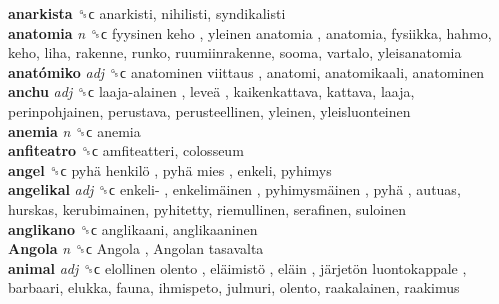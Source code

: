 \textbf{anarkista} ␝ϲ  anarkisti, nihilisti, syndikalisti  \\
\textbf{anatomia} \emph{n}  ␝ϲ   fyysinen keho ,  yleinen anatomia , anatomia, fysiikka, hahmo, keho, liha, rakenne, runko, ruumiinrakenne, sooma, vartalo, yleisanatomia  \\
\textbf{anatómiko} \emph{adj}  ␝ϲ   anatominen viittaus , anatomi, anatomikaali, anatominen  \\
\textbf{anchu} \emph{adj}  ␝ϲ   laaja-alainen ,  leveä , kaikenkattava, kattava, laaja, perinpohjainen, perustava, perusteellinen, yleinen, yleisluonteinen  \\
\textbf{anemia} \emph{n}  ␝ϲ  anemia  \\
\textbf{anfiteatro} ␝ϲ  amfiteatteri, colosseum  \\
\textbf{angel} ␝ϲ   pyhä henkilö ,  pyhä mies , enkeli, pyhimys  \\
\textbf{angelikal} \emph{adj}  ␝ϲ   enkeli- ,  enkelimäinen ,  pyhimysmäinen ,  pyhä , autuas, hurskas, kerubimainen, pyhitetty, riemullinen, serafinen, suloinen  \\
\textbf{anglikano} ␝ϲ  anglikaani, anglikaaninen  \\
\textbf{Angola} \emph{n}  ␝ϲ   Angola ,  Angolan tasavalta   \\
\textbf{animal} \emph{adj}  ␝ϲ   elollinen olento ,  eläimistö ,  eläin ,  järjetön luontokappale , barbaari, elukka, fauna, ihmispeto, julmuri, olento, raakalainen, raakimus  \\
